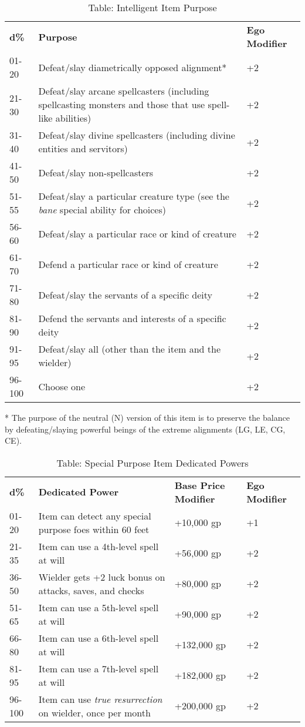 \begin{table}[]
\sffamily
\caption{Table: Intelligent Item Purpose}
\begin{tabular}{lll}
\textbf{d\%} & \textbf{Purpose} & \textbf{Ego Modifier}\\
01-20 & Defeat/slay diametrically opposed alignment* & +2 \\
 21-30 & Defeat/slay arcane spellcasters (including spellcasting monsters and those that use spell-like abilities) & +2 \\
 31-40 & Defeat/slay divine spellcasters (including divine entities and servitors) & +2 \\
 41-50 & Defeat/slay non-spellcasters & +2 \\
 51-55 & Defeat/slay a particular creature type (see the \textit{bane} special ability for choices)  & +2 \\
 56-60 & Defeat/slay a particular race or kind of creature & +2 \\
 61-70 & Defend a particular race or kind of creature & +2 \\
 71-80 & Defeat/slay the servants of a specific deity & +2 \\
 81-90 & Defend the servants and interests of a specific deity & +2 \\
 91-95 & Defeat/slay all (other than the item and the wielder) & +2 \\
 96-100 & Choose one & +2\\

\end{tabular}
* The purpose of the neutral (N) version of this item is to preserve the balance by defeating/slaying powerful beings of the extreme alignments (LG, LE, CG, CE).\\
\end{table}
\begin{table}[]
\sffamily
\caption{Table: Special Purpose Item Dedicated Powers}
\begin{tabular}{llll}
\textbf{d\%} & \textbf{Dedicated Power} & \textbf{Base Price Modifier} & \textbf{Ego Modifier}\\
01-20 & Item can detect any special purpose foes within 60 feet & +10,000 gp & +1 \\
 21-35 & Item can use a 4th-level spell at will & +56,000 gp & +2 \\
 36-50 & Wielder gets +2 luck bonus on attacks, saves, and checks & +80,000 gp & +2 \\
 51-65 & Item can use a 5th-level spell at will & +90,000 gp & +2 \\
 66-80 & Item can use a 6th-level spell at will & +132,000 gp & +2 \\
 81-95 & Item can use a 7th-level spell at will & +182,000 gp & +2 \\
 96-100 & Item can use \textit{true resurrection }on wielder, once per month  & +200,000 gp & +2\\
\end{tabular}
\end{table}

